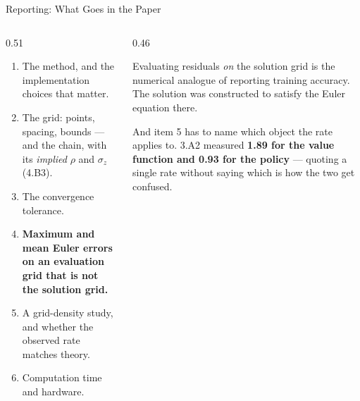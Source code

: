 \begin{frame}{Reporting: What Goes in the Paper}
\begin{columns}[T]
\begin{column}{0.51\textwidth}
\small
\begin{enumerate}\footnotesize
  \item The method, and the implementation choices that matter.
  \item The grid: points, spacing, bounds --- and the chain, with its \emph{implied} $\rho$ and $\sigma_z$ (4.B3).
  \item The convergence tolerance.
  \item \textbf{Maximum and mean Euler errors on an evaluation grid that is not the solution grid.}
  \item A grid-density study, and whether the observed rate matches theory.
  \item Computation time and hardware.
\end{enumerate}
\end{column}
\begin{column}{0.46\textwidth}
\begin{cautionbox}[title=\textbf{Item 4 is the one with teeth}]\small
Evaluating residuals \emph{on} the solution grid is the numerical analogue of reporting training accuracy. The solution was constructed to satisfy the Euler equation there.
\end{cautionbox}
\medskip
\begin{takeawaybox}\footnotesize
And item 5 has to name which object the rate applies to. 3.A2 measured \textbf{1.89 for the value function and 0.93 for the policy} --- quoting a single rate without saying which is how the two get confused.
\end{takeawaybox}
\end{column}
\end{columns}
\vspace{1mm}
\end{frame}

